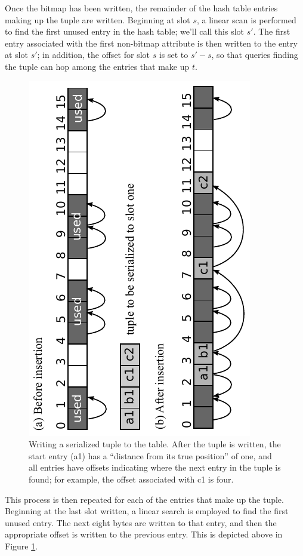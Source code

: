 \documentclass{sig-alternate}
\renewcommand\:{\colon} %
\begin{document}
Once the bitmap has been written, the remainder of the hash table entries making up the tuple are written.  
Beginning at slot $s$, a linear scan is performed to find the first unused entry in the hash table; we'll call this
slot $s'$.  The first entry associated with the first non-bitmap attribute is then written to the entry
at slot $s'$; in addition, the offset for slot $s$ is set to $s' - s$,
so that queries finding the tuple can hop among the entries that make up $t$.

\begin{figure}
\includegraphics[scale=0.85, angle=-90]{AddingToTable.pdf}
\caption{Writing a serialized tuple to the table. After the tuple is written,
the start entry (a1) has a ``distance from its true position'' of one, and all entries have offsets indicating where
the next entry in the tuple is found; for example, the offset associated with c1 is four.} \label{writingtuple}
\end{figure}

This process is then repeated for each of the entries that make up the tuple.  Beginning at the last slot written, a
linear search is employed to find the first unused entry.  
The next eight bytes are written to that entry, and then the appropriate offset is written to the previous entry.
This is depicted above in Figure \ref{writingtuple}.
\end{document}
